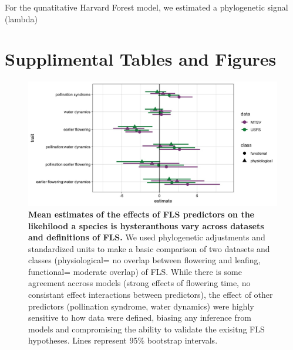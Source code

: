 \documentclass[12pt]{article}\usepackage[]{graphicx}\usepackage[]{color}
\begin{document}
{\noindent For the qunatitative Harvard Forest model, we estimated a phylogenetic signal (lambda)

\section*{Supplimental Tables and Figures}

\begin{figure}[h!]
    \centering
 \includegraphics[width=\textwidth]{..//MTSV_USFS.jpeg} 
    \caption{\textbf{Mean estimates of the effects of FLS predictors on the likehilood a species is hysteranthous vary across datasets and definitions of FLS.}  We used phylogenetic adjustments and standardized units to make a basic comparison of two datasets and classes (physiological= no overlap between flowering and leafing, functional= moderate overlap) of FLS. While there is some agreement accross models (strong effects of flowering time, no consistant effect interactions between predictors), the effect of other predictors (pollination syndrome, water dynamics) were highly sensitive to how data were defined, biasing any inference from models and compromising the ability to validate the exisitng FLS hypotheses. Lines represent 95\% bootstrap intervals.}
    \label{fig:muplots.USMT}
\end{figure}

}
\end{document}
